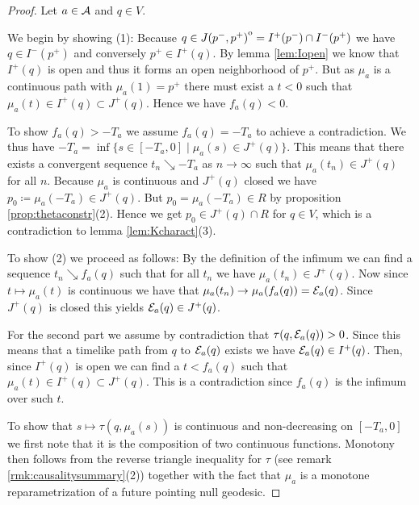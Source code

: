 \begin{proof}
Let $a\in {\mathcal{A}}$ and $q\in V$.

We begin by showing (1): 
Because $q \in {\kern0ptJ(p^-,p^+)}^{\mathrm{o}} = I^+(p^-)\cap I^-(p^+)$ we have $q\in I^-(p^+)$ and conversely $p^+\in I^+(q)$. By lemma \ref{lem:Iopen} we know that $I^+(q)$ is open and thus it forms an open neighborhood of $p^+$. But as $\mu_a$ is a continuous path with $\mu_a(1)=p^+$ there must exist a $t<0$ such that $\mu_a(t)\in I^+(q)\subset J^+(q)$. Hence we have $f_a(q)<0$.

To show $f_a(q)>-T_a$ we assume $f_a(q)=-T_a$ to achieve a contradiction. We thus have $-T_a=\inf \{s\in [-T_a,0] \mid \mu_a(s)\in J^+(q)\}$. This means that there exists a convergent sequence $t_n\searrow -T_a$ as $n\to \infty$ such that $\mu_a(t_n)\in J^+(q)$ for all $n$. Because $\mu_a$ is continuous and $J^+(q)$ closed we have $p_0\coloneqq \mu_a(-T_a)\in J^+(q)$. But $p_0=\mu_a(-T_a)\in R$ by proposition \ref{prop:thetaconstr}(2). Hence we get $p_0\in J^+(q) \cap R$ for $q\in V$, which is a contradiction to lemma \ref{lem:Kcharact}(3).

To show (2) we proceed as follows:
By the definition of the infimum we can find a sequence $t_n\searrow f_a(q)$ such that for all $t_n$ we have $\mu_a(t_n)\in J^+(q)$. Now since $t\mapsto \mu_a(t)$ is continuous we have that $\mu_a(t_n)\to \mu_a(f_a(q)) = {\mathcal{E}}_a(q)$. Since $J^+(q)$ is closed this yields ${\mathcal{E}}_a(q)\in J^+(q)$. 

For the second part we assume by contradiction that $\tau(q,{\mathcal{E}}_a(q)) > 0$. Since this means that a timelike path from $q$ to ${\mathcal{E}}_a(q)$ exists we have ${\mathcal{E}}_a(q)\in I^+(q)$. Then, since $I^+(q)$ is open we can find a $t<f_a(q)$ such that $\mu_a(t)\in I^+(q) \subset J^+(q)$. This is a contradiction since $f_a(q)$ is the infimum over such $t$.

To show that $s\mapsto \tau(q,\mu_a(s))$ is continuous and non-decreasing on $[-T_a,0]$ we first note that it is the composition of two continuous functions. Monotony then follows from the reverse triangle inequality for $\tau$ (see remark \ref{rmk:causalitysummary}(2)) together with the fact that $\mu_a$ is a monotone reparametrization of a future pointing null geodesic.


\end{proof}

